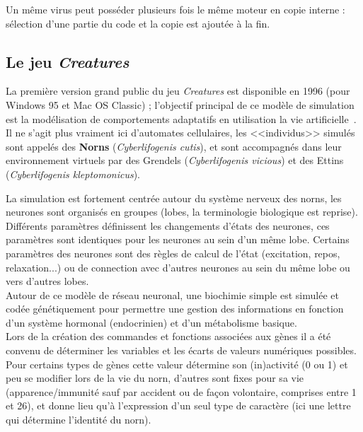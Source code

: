 \documentclass[11pt,twoside,a4paper]{article}
\begin{document}
Un m{\^e}me virus peut poss{\'e}der plusieurs fois le m{\^e}me moteur en copie interne : s{\'e}lection d'une partie du code et la copie est ajout{\'e}e {\`a} la fin.~\\

\subsection{Le jeu \textit{Creatures}}

La premi{\`e}re version grand public du jeu \textit{Creatures} est disponible en 1996 (pour Windows 95 et Mac OS Classic) ; l'objectif principal de ce mod{\`e}le de simulation est la mod{\'e}lisation de comportements adaptatifs en utilisation la vie artificielle~\cite{CliGra99,GraCli97,GraCli98,GrClMa96,GrClMa97}. Il ne s'agit plus vraiment ici d'automates cellulaires, les <<individus>> simul{\'e}s sont appel{\'e}s des \textbf{Norns} (\textit{Cyberlifogenis cutis}), et sont accompagn{\'e}s dans leur environnement virtuels par des Grendels (\textit{Cyberlifogenis vicious}) et des Ettins (\textit{Cyberlifogenis kleptomonicus}).~\\

\clearpage

La simulation est fortement centr{\'e}e autour du syst{\`e}me nerveux des norns, les neurones sont organis{\'e}s en groupes (lobes, la terminologie biologique est reprise). Diff{\'e}rents param{\`e}tres d{\'e}finissent les changements d'{\'e}tats des neurones, ces param{\`e}tres sont identiques pour les neurones au sein d'un m{\^e}me lobe. Certains param{\`e}tres des neurones sont des r{\`e}gles de calcul de l'{\'e}tat (excitation, repos, relaxation...) ou de connection avec d'autres neurones au sein du m{\^e}me lobe ou vers d'autres lobes.~\\

Autour de ce mod{\`e}le de r{\'e}seau neuronal, une biochimie simple est simul{\'e}e et cod{\'e}e g{\'e}n{\'e}tiquement pour permettre une gestion des informations en fonction d'un syst{\`e}me hormonal (endocrinien) et d'un m{\'e}tabolisme basique.~\\

Lors de la cr{\'e}ation des commandes et fonctions associ{\'e}es aux g{\`e}nes il a {\'e}t{\'e} convenu de d{\'e}terminer les variables et les {\'e}carts de valeurs num{\'e}riques possibles. Pour certains types de g{\`e}nes cette valeur d{\'e}termine son (in)activit{\'e} (0 ou 1) et peu se modifier lors de la vie du norn, d'autres sont fixes pour sa vie (apparence/immunit{\'e} sauf par accident ou de fa\c{c}on volontaire, comprises entre 1 et 26), et donne lieu qu'{\`a} l'expression d'un seul type de caract{\`e}re (ici une lettre qui d{\'e}termine l'identit{\'e} du norn).~\\
\end{document}
